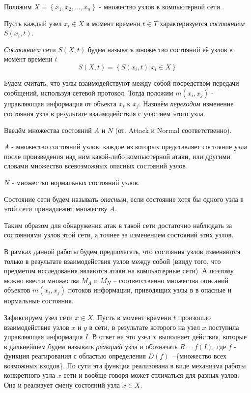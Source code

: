 \documentclass[12pt,a4paper]{article}
\begin{document}
Положим $X = \left\{x_1, x_2, ..., x_n\right\} $ - множество узлов в компьютерной сети.

Пусть каждый узел $x_i \in X$ в момент времени $t \in T$ характеризуется \textit{состоянием} $S(x_i, t)$.

\textit{Состоянием} сети $S(X, t)$ будем называть множество состояний её узлов в момент времени $t$
\begin{equation}
S(X, t) = \left\{S(x_i, t) | x_i \in X\right\}
\end{equation}


Будем считать, что узлы взаимодействуют между собой посредством передачи сообщений, используя сетевой протокол. Тогда положим $m(x_i, x_j)$ - управляющая информация от объекта $x_i$ к $x_j$. Назовём \textit{переходом} изменение состояния узла в результате взаимодействия с участием этого узла. 

Введём множества состояний $A$ и $N$ (от. Attack и Normal соответственно).

$A$ - множество состояний узлов, каждое из которых представляет состояние узла после произведения над ним какой-либо компьютерной атаки, или другими словами множество всевозможных опасных состояний узлов

$N$ - множество нормальных состояний узлов.

Состояние сети будем называть \textit{опасным}, если состояние хотя бы одного узла в этой сети принадлежит множеству $A$.

Таким образом для обнаружения атак в такой сети достаточно наблюдать за состояниями узлов этой сети, а точнее за изменением состояний этих узлов. 

В рамках данной работы будем предполагать, что состояния узлов изменяются только в результате взаимодействия узлов между собой (ввиду того, что предметом исследования являются атаки на компьютерные сети). А поэтому можно ввести множества $M_A$ и $M_N$ -- соответственно множества описаний объектов $m(x_i, x_j)$ потоков информации, приводящих узлы в в опасные и нормальные состояния.


Зафиксируем узел сети $x \in X$. 
Пусть в момент времени $t$ произошло взаимодействие узлов $x$ и $y$ в сети, в результате которого на узел $x$ поступила управляющая информация $I$. В ответ на это узел $x$ выполняет действия, которые в дальнейшем будем называть \textit{реакцией} узла и обозначать $R = f(I)$, где $f$ - функция реагирования с областью определения $D(f)$~--\{множество всех возможных входов\}. По сути эта функция реализована в виде механизма работы конкретного узла $x$ сети и вообще говоря может отличаться для разных узлов. Она и реализует смену состояний узла $x \in X$.
\end{document}
